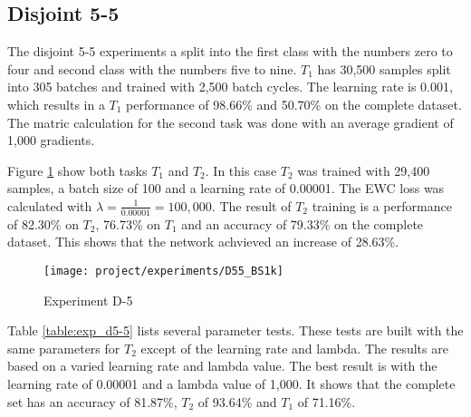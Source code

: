 \newpage

\subsection{Disjoint 5-5}

The disjoint 5-5 experiments a split into the first class with the numbers zero to four and second class with the numbers five to nine.
$T_1$ has 30,500 samples split into 305 batches and trained with 2,500 batch cycles.
The learning rate is 0.001, which results in a $T_1$ performance of 98.66\% and 50.70\% on the complete dataset.
The matric calculation for the second task was done with an average gradient of 1,000 gradients.

Figure \ref{fig:exp_d5-5_bs1k} show both tasks $T_1$ and $T_2$.
In this case $T_2$ was trained with 29,400 samples, a batch size of 100 and a learning rate of 0.00001.
The EWC loss was calculated with $\lambda = \frac{1}{0.00001} = 100,000$.
The result of $T_2$ training is a performance of 82.30\% on $T_2$, 76.73\% on $T_1$ and an accuracy of 79.33\% on the complete dataset.
This shows that the network achvieved an increase of 28.63\%.

\begin{figure}[H]
    \centering
    \texttt{[image: project/experiments/D55\_BS1k]}
    \caption{Experiment D-5}
    \label{fig:exp_d5-5_bs1k}
\end{figure}

\newpage

Table \ref{table:exp_d5-5} lists several parameter tests.
These tests are built with the same parameters for $T_2$ except of the learning rate and lambda.
The results are based on a varied learning rate and lambda value.
The best result is with the learning rate of 0.00001 and a lambda value of 1,000.
It shows that the complete set has an accuracy of 81.87\%, $T_2$ of 93.64\% and $T_1$ of 71.16\%.

